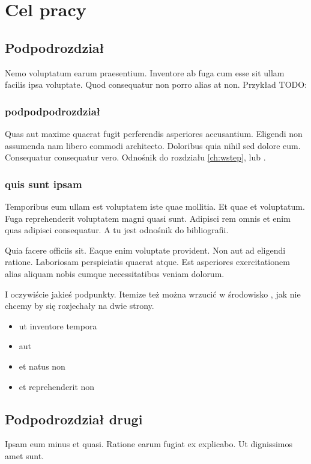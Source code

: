 \section{Cel pracy}

\subsection{Podpodrozdział}

Nemo voluptatum earum praesentium. Inventore ab fuga cum esse sit ullam facilis ipsa voluptate. Quod consequatur non porro alias at non. Przykład TODO:

\todo

\subsubsection{podpodpodrozdział}
Quas aut maxime quaerat fugit perferendis asperiores accusantium. Eligendi non assumenda nam libero commodi architecto. Doloribus quia nihil sed dolore eum. Consequatur consequatur vero.
Odnośnik do rozdziału \ref{ch:wstep}, lub .

\subsubsection{quis sunt ipsam}
Temporibus eum ullam est voluptatem iste quae mollitia. Et quae et voluptatum. Fuga reprehenderit voluptatem magni quasi sunt. Adipisci rem omnis et enim quas adipisci consequatur. A tu jest odnośnik do bibliografii.

Quia facere officiis sit. Eaque enim voluptate provident. Non aut ad eligendi ratione. Laboriosam perspiciatis quaerat atque. Est asperiores exercitationem alias aliquam nobis cumque necessitatibus veniam dolorum.

I oczywiście jakieś podpunkty. Itemize też można wrzucić w środowisko , jak nie chcemy by się rozjechały na dwie strony.

\begin{itemize}
    \item ut inventore tempora
    \item aut
    \item et natus non
    \item et reprehenderit non
\end{itemize}

\subsection{Podpodrozdział drugi}
Ipsam eum minus et quasi. Ratione earum fugiat ex explicabo. Ut dignissimos amet sunt.

